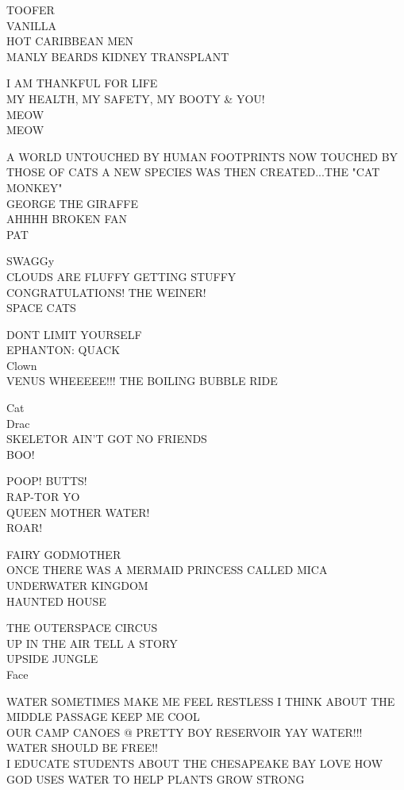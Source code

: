 \documentclass[10pt,letterpaper]{article}
\begin{document}
TOOFER\\
VANILLA\\
HOT CARIBBEAN MEN\\
MANLY BEARDS KIDNEY TRANSPLANT

I AM THANKFUL FOR LIFE\\
MY HEALTH, MY SAFETY, MY BOOTY \& YOU!\\
MEOW\\
MEOW

A WORLD UNTOUCHED BY HUMAN FOOTPRINTS NOW TOUCHED BY THOSE OF CATS A NEW SPECIES WAS THEN CREATED...THE "CAT MONKEY"\\
GEORGE THE GIRAFFE\\
AHHHH BROKEN FAN\\
PAT

SWAGGy\\
CLOUDS ARE FLUFFY GETTING STUFFY\\
CONGRATULATIONS!  THE WEINER!\\
SPACE CATS

DONT LIMIT YOURSELF\\
EPHANTON: QUACK\\
Clown\\
VENUS WHEEEEE!!! THE BOILING BUBBLE RIDE

Cat\\
Drac\\
SKELETOR AIN'T GOT NO FRIENDS\\
BOO!

POOP!  BUTTS!\\
RAP{-}TOR YO\\
QUEEN MOTHER WATER!\\
ROAR!

FAIRY GODMOTHER\\
ONCE THERE WAS A MERMAID PRINCESS CALLED MICA\\
UNDERWATER KINGDOM\\
HAUNTED HOUSE

THE OUTERSPACE CIRCUS\\
UP IN THE AIR TELL A STORY\\
UPSIDE JUNGLE\\
Face

WATER SOMETIMES MAKE ME FEEL RESTLESS I THINK ABOUT THE MIDDLE PASSAGE KEEP ME COOL\\
OUR CAMP CANOES @ PRETTY BOY RESERVOIR YAY WATER!!!\\
WATER SHOULD BE FREE!!\\
I EDUCATE STUDENTS ABOUT THE CHESAPEAKE BAY LOVE HOW GOD USES WATER TO HELP PLANTS GROW STRONG
\end{document}
